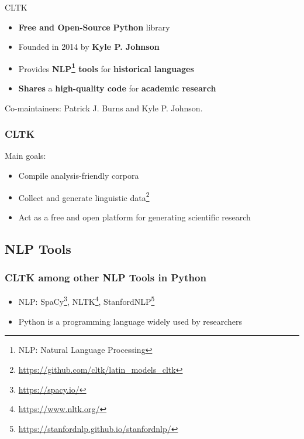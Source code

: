 \documentclass{beamer}
\begin{document}
\begin{frame}{CLTK}
\begin{itemize}
    \item \textbf{Free and Open-Source} \textbf{Python} library
    \pause
    \item Founded in 2014 by \textbf{Kyle P. Johnson}
    \pause
    \item Provides \textbf{NLP\footnote{NLP: Natural Language Processing} tools} for \textbf{historical languages}
    \pause
    \item \textbf{Shares} a \textbf{high-quality code} for \textbf{academic research}
    
\end{itemize}
\pause
Co-maintainers: Patrick J. Burns and Kyle P. Johnson.
    
\end{frame}


\begin{frame}
\frametitle{CLTK}
Main goals:
\begin{itemize}
\item[1.] Compile analysis-friendly corpora
\item[2.] Collect and generate linguistic data\footnote{\href{https://github.com/cltk/latin_models_cltk}{https://github.com/cltk/latin\_models\_cltk}}
\item[3.] Act as a free and open platform for generating scientific research

\end{itemize}
    
\end{frame}

\subsection{NLP Tools}
\begin{frame}
\frametitle{CLTK among other NLP Tools in Python}
\begin{itemize}
    
    \item NLP: SpaCy\footnote{\href{https://spacy.io/}{https://spacy.io/}}, NLTK\footnote{\href{https://www.nltk.org/}{https://www.nltk.org/}}, StanfordNLP\footnote{\href{https://stanfordnlp.github.io/stanfordnlp/}{https://stanfordnlp.github.io/stanfordnlp/}}
    \item Python is a programming language widely used by researchers
\end{itemize}
\end{frame}
\end{document}
